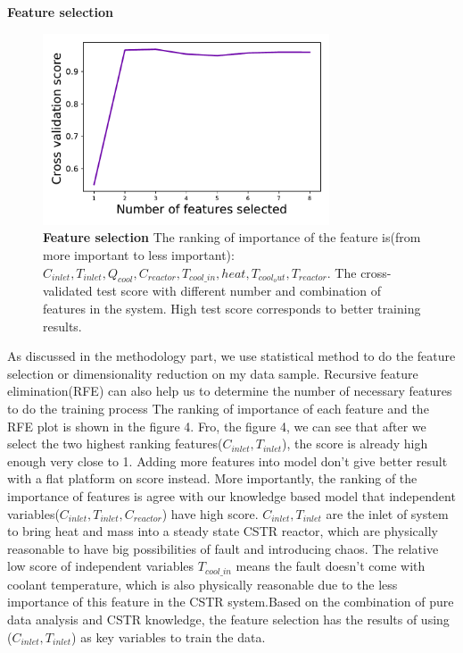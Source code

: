 \documentclass[fleqn,11pt]{wlscirep}
\begin{document}
\textbf{Feature selection}
\begin{figure}[h]
    \centering
    \includegraphics[width=8.5cm]{figure4.pdf}
    \caption{
    \textbf{Feature selection} The ranking of importance of the feature is(from more important to less important): $C_{inlet}, T_{inlet}, Q_{cool}, C_{reactor}, T_{cool\_in}, heat, T_{cool_out}, T_{reactor}$. The cross-validated test score with different number and combination of  features in the system. High test score corresponds to better training results. }
    \label{fig:1}
\end{figure}
 As discussed in the methodology part, we use statistical method to do the feature selection or dimensionality reduction on my data sample. Recursive feature elimination(RFE) can also help us to determine the number of necessary  features to do the training process  
 The ranking of importance of each feature and the RFE plot is shown in the figure 4. Fro, the figure 4, we can see that after we select the two highest ranking features($C_{inlet}, T_{inlet}$), the score is already high enough very close to 1. Adding more features into model don't give better result with a flat platform on score instead. More importantly, the ranking of the importance of features is agree with our knowledge based model  that independent variables($C_{inlet}, T_{inlet},C_{reactor} $) have high score. $C_{inlet}, T_{inlet}$ are the inlet of  system to bring heat and mass into a steady state CSTR reactor, which are physically reasonable to have big possibilities of fault and introducing chaos. The relative low score of independent variables $T_{cool\_in}$ means the fault doesn't come with coolant temperature, which is also physically reasonable due to the less importance of this feature in the CSTR system.Based on the combination of  pure data analysis  and CSTR knowledge, the feature selection has the results of using ($C_{inlet}, T_{inlet}$) as key variables to train the data.
\end{document}
